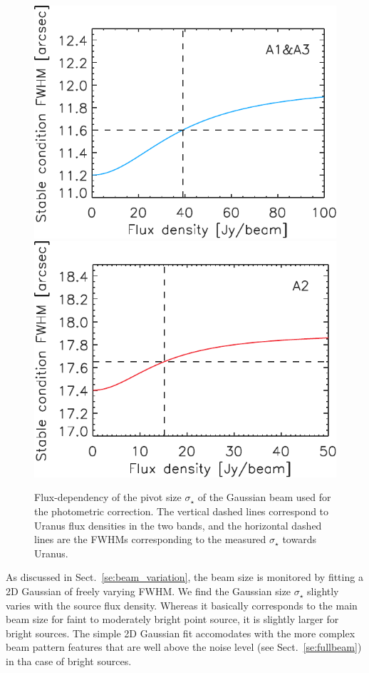 \begin{figure}[ht!]
  \begin{center}
    \includegraphics[clip=true, trim={0, -0.3cm, -0.3cm, 0}, width=0.49\linewidth]{Figures/FWHM_stable_empiric_ref_1mm.pdf}
    \includegraphics[clip=true, trim={0, -0.3cm, -0.3cm, 0}, width=0.49\linewidth]{Figures/FWHM_stable_empiric_ref_a2.pdf}
    \caption[Photometric correction pivot Gaussian
      size]{Flux-dependency of the pivot size $\sigma_\star$ of the
      Gaussian beam used for the photometric correction. %
      The vertical dashed lines correspond to Uranus flux densities in
      the two bands, and the horizontal dashed lines are the FWHMs
    corresponding to the measured $\sigma_\star$ towards Uranus.}
    \label{fig:sigma_stable_vs_flux}
  \end{center}
\end{figure}

As discussed in Sect.~\ref{se:beam_variation}, the beam size is
monitored by fitting a 2D Gaussian of freely varying FWHM.
We find the Gaussian size $\sigma_{\star}$ slightly varies with the
source flux density. Whereas it basically corresponds to the main beam
size for faint to moderately bright point source, it is slightly
larger for bright sources. The simple 2D Gaussian fit
accomodates with the more complex beam pattern features that are well
above the noise level (see Sect.~\ref{se:fullbeam}) in tha case of
bright sources.

